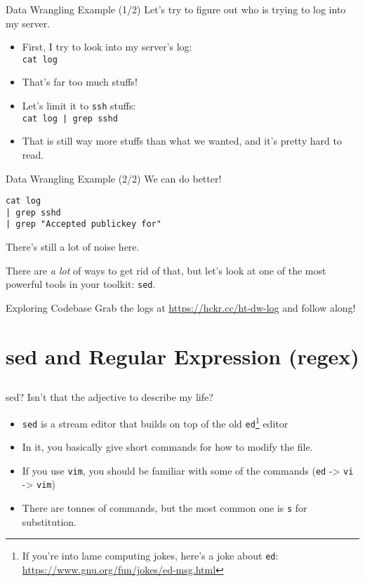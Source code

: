 \documentclass[12pt]{beamer}
\begin{document}
\begin{frame}[fragile]{Data Wrangling Example (1/2)}
  Let's try to figure out who is trying to log into my server.
  \begin{itemize}
    \item First, I try to look into my server's log: \\\texttt{cat log}
    \item That's far too much stuffs!
    \item Let's limit it to \texttt{ssh} stuffs: \\\texttt{cat log | grep sshd}
    \item That is still way more stuffs than what we wanted, and it's pretty hard to read.
  \end{itemize}
\end{frame}

\begin{frame}[fragile]{Data Wrangling Example (2/2)}
  We can do better!
  \begin{verbatim}
cat log
| grep sshd
| grep "Accepted publickey for"
  \end{verbatim}
  There's still a lot of noise here.

  There are \emph{a lot} of ways to get rid of that, but let’s look at one of the most powerful tools in your toolkit: \texttt{sed}.
\end{frame}

\begin{frame}{Exploring Codebase}
Grab the logs at \url{https://hckr.cc/ht-dw-log} and follow along!
\end{frame}

\section{sed and Regular Expression (regex)}
\subsection{}
\begin{frame}{sed? Isn't that the adjective to describe my life?}
  \begin{itemize}
    \item \texttt{sed} is a stream editor that builds on top of the old \texttt{ed}\footnote{If you're into lame computing jokes, here's a joke about \texttt{ed}: \url{https://www.gnu.org/fun/jokes/ed-msg.html}} editor
    \item In it, you basically give short commands for how to modify the file.
    \item If you use \texttt{vim}, you should be familiar with some of the commands (\texttt{ed} -> \texttt{vi} -> \texttt{vim})
    \item There are tonnes of commands, but the most common one is \texttt{s} for substitution.
  \end{itemize}
\end{frame}
\end{document}
